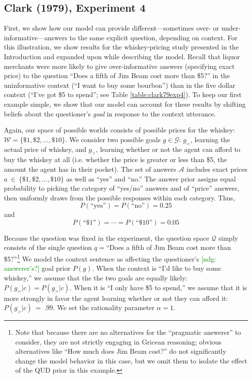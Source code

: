 \documentclass[12pt, floatsintext, jou]{apa6}
\newcommand{\ndg}[1]{\textcolor{Green}{[ndg: #1]}}
\begin{document}
\subsection{Clark (1979), Experiment 4}
First, we show how our model can provide different---sometimes over- or under-informative---answers to the same explicit question, depending on context. For this illustration, we show results for the whiskey-pricing study presented in the Introduction \cite{Clark79_IndirectSpeechActs} and expanded upon while describing the model. Recall that liquor merchants were more likely to give over-informative answers (specifying exact price) to the question ``Does a fifth of Jim Beam cost more than \$5?'' in the uninformative context (``I want to buy some bourbon'') than in the five dollar context (``I've got \$5 to spend''; see Table \ref{table:clark79exp4}). To keep our first example simple, we show that our model can account for these results by shifting beliefs about the questioner's \emph{goal} in response to the context utterance. 

Again, our space of possible worlds consists of possible prices for the whiskey: $\mathcal{W} = \{\$1, \$2, \dots, \$10\}$. We consider two possible goals $g \in \mathcal{G}$: $g_=$, learning the actual price of whiskey,  and $g_>$, learning whether or not the agent can afford to buy the whiskey at all (i.e. whether the price is greater or less than \$5, the amount the agent has in their pocket). The set of answers $\mathcal{A}$ includes exact prices $a~\in~\{\$1, \$2, \dots, \$10\}$ as well as ``yes'' and ``no.'' The answer prior assigns equal probability to picking the category of ``yes/no'' answers and of ``price'' answers, then uniformly draws from the possible responses within each category. Thus, $$P(\textrm{``yes''}) = P(\textrm{``no''}) = 0.25$$ and $$P(\textrm{``\$1''}) = \cdots = P(\textrm{``\$10''}) = 0.05$$

Because the question was fixed in the experiment, the question space $\mathcal{Q}$ simply consists of the single question $q = $``Does a fifth of Jim Beam cost more than \$5?''\footnote{Note that because there are no alternatives for the ``pragmatic answerer'' to consider, they are not strictly engaging in Gricean reasoning; obvious alternatives like ``How much does Jim Beam cost?'' do not significantly change the model behavior in this case, but we omit them to isolate the effect of the QUD prior in this example.}  We model the context sentence as affecting the questioner's \ndg{answerer's?} goal prior $P(g)$. When the context is ``I'd like to buy some whiskey,'' we assume that the the two goals are equally likely: $P(g_= | c) = P(g_> | c)$. When it is ``I only have \$5 to spend,'' we assume that it is more strongly in favor the agent learning whether or not they can afford it: $P(g_> | c)~=~.99$. We set the rationality parameter $\alpha = 1$.
\end{document}
